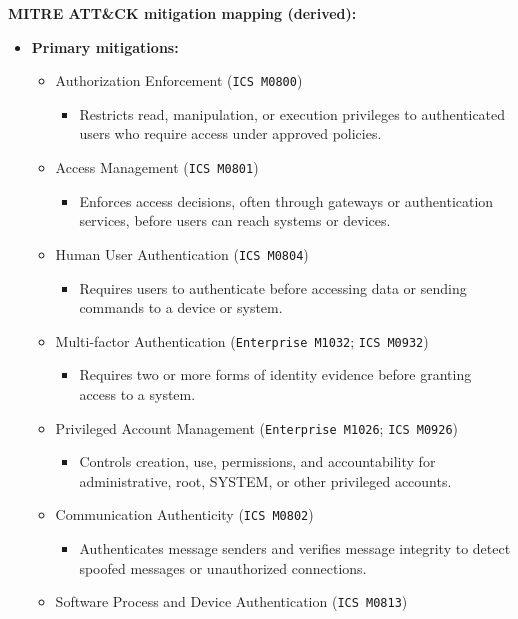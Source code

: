 \documentclass[10pt,a4paper,oneside]{report}
\begin{document}
\textbf{MITRE ATT\&CK mitigation mapping (derived):}

\begin{itemize}
\item \textbf{Primary mitigations:}
\begin{itemize}
\item Authorization Enforcement (\texttt{ICS M0800})
\begin{itemize}
\item Restricts read, manipulation, or execution privileges to authenticated users who require access under approved policies.
\end{itemize}
\item Access Management (\texttt{ICS M0801})
\begin{itemize}
\item Enforces access decisions, often through gateways or authentication services, before users can reach systems or devices.
\end{itemize}
\item Human User Authentication (\texttt{ICS M0804})
\begin{itemize}
\item Requires users to authenticate before accessing data or sending commands to a device or system.
\end{itemize}
\item Multi-factor Authentication (\texttt{Enterprise M1032}; \texttt{ICS M0932})
\begin{itemize}
\item Requires two or more forms of identity evidence before granting access to a system.
\end{itemize}
\item Privileged Account Management (\texttt{Enterprise M1026}; \texttt{ICS M0926})
\begin{itemize}
\item Controls creation, use, permissions, and accountability for administrative, root, SYSTEM, or other privileged accounts.
\end{itemize}
\item Communication Authenticity (\texttt{ICS M0802})
\begin{itemize}
\item Authenticates message senders and verifies message integrity to detect spoofed messages or unauthorized connections.
\end{itemize}
\item Software Process and Device Authentication (\texttt{ICS M0813})
\begin{itemize}

\end{itemize}
\end{itemize}
\end{itemize}
\end{document}
